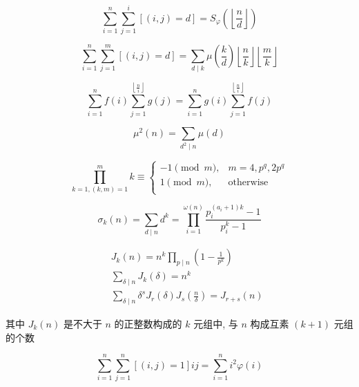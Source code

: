 \begin{equation}
    \sum_{i = 1} ^ n \sum_{j = 1} ^ i \left[(i, j) = d\right] = S_\varphi \left( \left\lfloor \frac n d \right\rfloor \right)
\end{equation}

\begin{equation}
    \sum_{i = 1} ^ n \sum_{j = 1} ^ m \left[(i, j) = d\right] = \sum_{d \mid  k} \mu\left( \frac k d \right) \left\lfloor \frac n k \right\rfloor \left\lfloor \frac m k \right\rfloor
\end{equation}

\begin{equation}
    \sum_{i = 1} ^ n f(i) \sum_{j = 1} ^ {\left\lfloor \frac n i \right\rfloor} g(j) = \sum_{i = 1} ^ n g(i) \sum_{j = 1} ^ {\left\lfloor \frac n i \right\rfloor} f(j)
\end{equation}

\begin{equation}
    \mu^2(n) = \sum_{d^2 \mid n} \mu (d)
\end{equation}

\begin{equation}
    \prod_{k=1,(k, m) = 1}^{m} k \equiv
    \begin{cases}
        -1 \pmod m, & m = 4, p^q, 2p^q \\
        1 \pmod m,  & \text{otherwise} \\
    \end{cases}
\end{equation}

\begin{equation}
    \sigma_k(n) = \sum_{d\mid n}d^k = \prod_{i=1}^{\omega(n)}\frac{p_i^{(a_i+1)k}-1}{p_i^k-1}
\end{equation}

\begin{eqnarray}
    &&J_k(n) = n^k\prod_{p\mid n}\left(1-\frac{1}{p^k}\right) \\
    &&\sum_{\delta\mid n}J_k(\delta) = n^k \\
    &&\sum_{\delta\mid n}\delta^sJ_r(\delta)J_s\left(\frac{n}{\delta}\right) = J_{r+s}(n)
\end{eqnarray}

其中 \(J_k(n)\) 是不大于 \(n\) 的正整数构成的 \(k\) 元组中, 与 \(n\) 构成互素 \((k + 1)\) 元组的个数

\begin{equation}
    \sum_{i=1}^{n} \sum_{j=1}^{n} [(i,j)=1]ij =  \sum_{i=1}^{n} i^2\varphi(i)
\end{equation}

